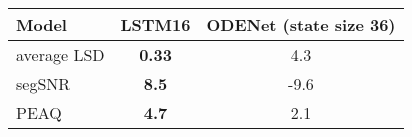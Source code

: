 \newcommand{\modelNameCellWidth}{1.8cm}
    \begin{tabular}{@{} l c c @{}}
        \toprule
        \textbf{Model} & \textbf{LSTM16} & \textbf{ODENet (state size 36)} \\ \midrule
        average \acs{LSD} & \textbf{0.33} & 4.3 \\
        segSNR  & \textbf{8.5} & -9.6  \\
        PEAQ     & \textbf{4.7} & 2.1 \\ \bottomrule
    \end{tabular}%
    